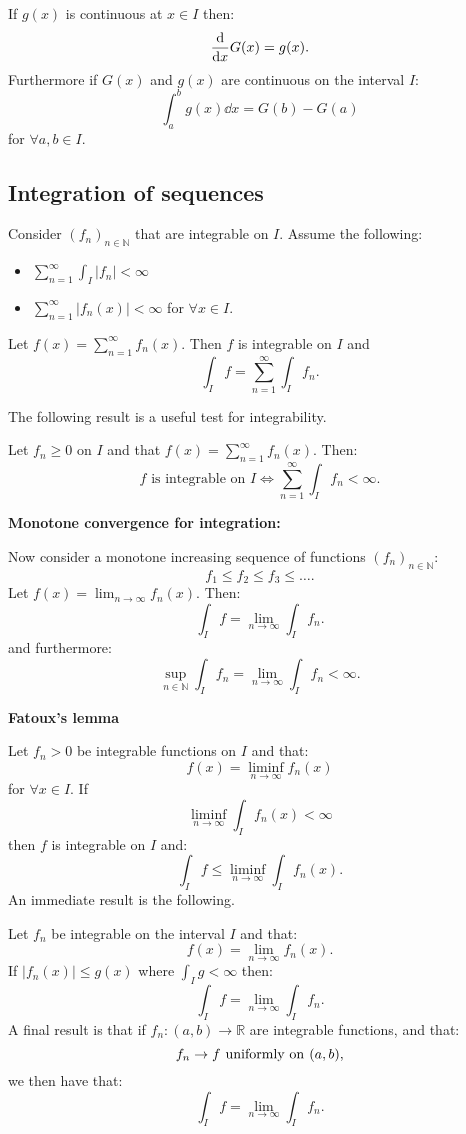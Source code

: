\documentclass{article}
\begin{document}
If $g(x)$ is continuous at $x\in I$ then:
$$\dv{x} G(x)=g(x).$$
Furthermore if $G(x)$ and $g(x)$ are continuous on the interval $I$:
$$\int_{a}^{b}g(x)\dd x=G(b)-G(a)$$
for $\forall a,b\in I$.

\subsection{Integration of sequences}
Consider $(f_n)_{n\in\mathbb{N}}$ that are integrable on $I$. Assume the following:
\begin{itemize}
    \item $\displaystyle\sum_{n=1}^{\infty}
    \int_I |f_n|<\infty$
    \item $\displaystyle\sum_{n=1}^{\infty}
    |f_n(x)|<\infty$ for $\forall x\in I$.
\end{itemize}
Let $f(x)=\displaystyle\sum_{n=1}^{\infty}f_n(x)$.
Then $f$ is integrable on $I$ and
$$\int_I f=\sum_{n=1}^{\infty}\int_I f_n.$$

\newpage

The following result is a useful test for integrability.

Let $f_n\geq0$ on $I$ and that
$f(x)=\displaystyle\sum_{n=1}^{\infty}f_n(x)$. Then:
$$\text{$f$ is integrable on $I$}
\iff\sum_{n=1}^{\infty}\int_I f_n<\infty.$$

\textbf{Monotone convergence for integration:}

Now consider a monotone increasing sequence of functions $(f_n)_{n\in\mathbb{N}}$:
$$f_1\leq f_2\leq f_3\leq\dots.$$
Let $f(x)=\displaystyle\lim_{n\rightarrow\infty}f_n(x)$. Then:
$$\int_I f=\lim_{n\rightarrow\infty}\int_I f_n.$$
and furthermore:
$$\sup_{n\in\mathbb{N}}\int_I f_n
=\lim_{n\rightarrow\infty}\int_I f_n <\infty.$$

\textbf{Fatoux's lemma}

Let $f_n>0$ be integrable functions on $I$ and that:
$$f(x)=\liminf_{n\rightarrow\infty} f_n(x)$$
for $\forall x\in I$. If
$$\liminf_{n\rightarrow\infty}\int_I f_n(x)<\infty$$
then $f$ is integrable on $I$ and:
$$\int_I f\leq
\liminf_{n\rightarrow\infty}\int_I f_n(x).$$
An immediate result is the following. 

Let $f_n$ be integrable on the interval $I$ and that:
$$f(x)=\lim_{n\rightarrow\infty}f_n(x).$$
If $|f_n(x)|\leq g(x)$ where $\displaystyle\int_I g<\infty$ then:
$$\int_I f=\lim_{n\rightarrow\infty}\int_I f_n.$$
A final result is that if $f_n:(a,b)\rightarrow\mathbb{R}$ are integrable functions, and that:
$$f_n\rightarrow f\hspace{0.05in}\text{uniformly on}\hspace{0.05in}(a,b),$$
we then have that:
$$\int_I f=\lim_{n\rightarrow\infty}\int_I f_n.$$
\end{document}
